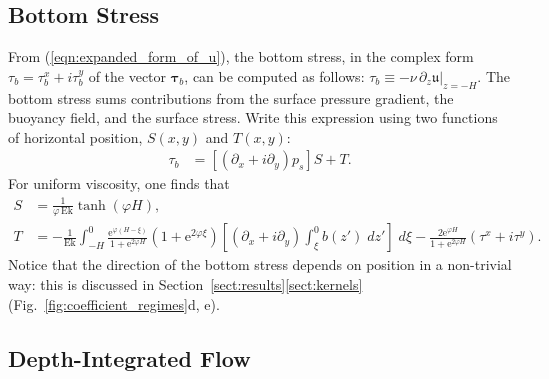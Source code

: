 \documentclass{ametsocV6.2}
\begin{document}
\subsection{Bottom Stress}

From (\ref{eqn:expanded_form_of_u}), the bottom stress, in the complex form $\tau_b = \tau^x_b + i \tau^y_b$ of the vector $\boldsymbol{\tau}_b$, can be computed as follows: $\tau_b \equiv  - \nu \, \partial_z \mathfrak{u}|_{z = -H}$.
The bottom stress sums contributions from the surface pressure gradient, the buoyancy field, and the surface stress.
Write this expression using two functions of horizontal position, $S(x,y)$ and $T(x,y)$:
\begin{align}
\tau_b &=  \left[ \left(\partial_x  + i \partial_y\right) p_s \right] S + T .
\label{eqn:bottom_stress_ST_def}
 \end{align}
For uniform viscosity, one finds that
 \begin{align}
S &= 
\frac{1}{\varphi \, \mathrm{Ek}} \tanh \left( \varphi H \right)  ,  \label{eqn:S_fn}  \\
T & = - \frac{1}{\mathrm{Ek}} \int_{-H}^{0} 
\frac{ \mathrm{e}^{\varphi (H - \xi )  } }{ 1 + \mathrm{e}^{2 \varphi H } }
\left( 1 + \mathrm{e}^{2 \varphi \xi}\right) 
 \left[ \left(\partial_x  + i \partial_y\right)  \int_{\xi}^{0} b(z') \; dz'   \right] \; d \xi 
-\frac{ 2 \mathrm{e}^{\varphi H } }{ 1 + \mathrm{e}^{2 \varphi H } }
 \left( \tau^x + i \tau^y \right) .
 \label{eqn:T_fn}
\end{align} 
Notice that the direction of the bottom stress depends on position in a non-trivial way: this is discussed in Section~\ref{sect:results}\ref{sect:kernels} (Fig.~\ref{fig:coefficient_regimes}d, e).

\subsection{Depth-Integrated Flow}
\end{document}
